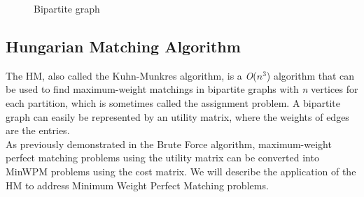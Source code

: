 \begin{figure}[H]
  \centering
  \begin{subfigure}{0.48\linewidth}
    \centering
    \caption{}
    \label{fig:match_1}
  \end{subfigure}
  \hspace{0.02\linewidth}
  \begin{subfigure}{0.48\linewidth}
    \centering
    \caption{}
    \label{fig:match_2}
  \end{subfigure}
  \caption{Bipartite graph}
\end{figure}

\subsection{Hungarian Matching Algorithm}

The HM, also called the Kuhn-Munkres algorithm, is a \textit{O}($\textit{n}^3$) algorithm that can be used to find maximum-weight matchings in bipartite graphs with \textit{n} vertices for each partition, which is sometimes called the assignment problem.
A bipartite graph can easily be represented by an utility matrix, where the weights of edges are the entries. \\
As previously demonstrated in the Brute Force algorithm, maximum-weight perfect matching problems using the utility matrix can be converted into MinWPM problems using the cost matrix. 
We will describe the application of the HM to address Minimum Weight Perfect Matching problems.
\\

